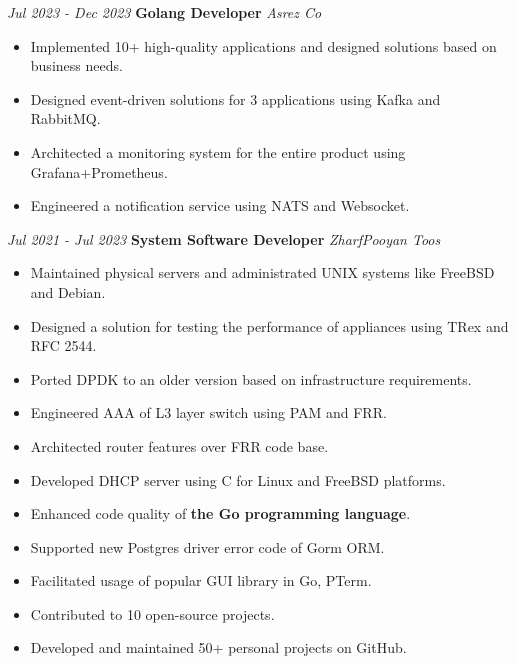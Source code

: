 \documentclass{engineercv}
\begin{document}
\begin{twocolentry}{\textit{Jul 2023 - Dec 2023}}
  \textbf{Golang Developer}
  \textit{Asrez Co}
\end{twocolentry}

\begin{itemize}
  \item Implemented 10+ high-quality applications and designed solutions based on business needs.
  \item Designed event-driven solutions for 3 applications using Kafka and RabbitMQ.
  \item Architected a monitoring system for the entire product using Grafana+Prometheus.
  \item Engineered a notification service using NATS and Websocket.
\end{itemize}

\begin{twocolentry}{\textit{Jul 2021 - Jul 2023}}
  \textbf{System Software Developer}
  \textit{ZharfPooyan Toos}
\end{twocolentry}

\begin{itemize}
  \item Maintained physical servers and administrated UNIX systems like FreeBSD and Debian.
  \item Designed a solution for testing the performance of appliances using TRex and RFC 2544.
  \item Ported DPDK to an older version based on infrastructure requirements.
  \item Engineered AAA of L3 layer switch using PAM and FRR.
  \item Architected router features over FRR code base.
  \item Developed DHCP server using C for Linux and FreeBSD platforms.
\end{itemize}

\begin{itemize}
  \item Enhanced code quality of \textbf{the Go programming language}.
  \item Supported new Postgres driver error code of Gorm ORM.
  \item Facilitated usage of popular GUI library in Go, PTerm.
  \item Contributed to 10 open-source projects.
  \item Developed and maintained 50+ personal projects on GitHub.
\end{itemize}
\end{document}

